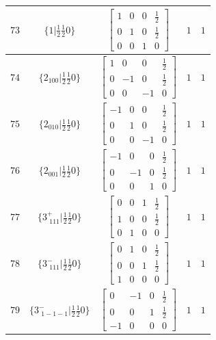 \documentclass[fleqn,8pt]{jsarticle}
\begin{document}
\begin{longtable}{ccccc}
$ 73 $ & $ \{1|\frac{1}{2} \frac{1}{2} 0\} $ & $ \begin{bmatrix} 1 & 0 & 0 & \frac{1}{2} \\ 0 & 1 & 0 & \frac{1}{2} \\ 0 & 0 & 1 & 0 \end{bmatrix} $ & $ 1 $ & $ 1 $ \\ \hline
$ 74 $ & $ \{2{}_{100}|\frac{1}{2} \frac{1}{2} 0\} $ & $ \begin{bmatrix} 1 & 0 & 0 & \frac{1}{2} \\ 0 & -1 & 0 & \frac{1}{2} \\ 0 & 0 & -1 & 0 \end{bmatrix} $ & $ 1 $ & $ 1 $ \\ \hline
$ 75 $ & $ \{2{}_{010}|\frac{1}{2} \frac{1}{2} 0\} $ & $ \begin{bmatrix} -1 & 0 & 0 & \frac{1}{2} \\ 0 & 1 & 0 & \frac{1}{2} \\ 0 & 0 & -1 & 0 \end{bmatrix} $ & $ 1 $ & $ 1 $ \\ \hline
$ 76 $ & $ \{2{}_{001}|\frac{1}{2} \frac{1}{2} 0\} $ & $ \begin{bmatrix} -1 & 0 & 0 & \frac{1}{2} \\ 0 & -1 & 0 & \frac{1}{2} \\ 0 & 0 & 1 & 0 \end{bmatrix} $ & $ 1 $ & $ 1 $ \\ \hline
$ 77 $ & $ \{3^{+}_{\,\,111}|\frac{1}{2} \frac{1}{2} 0\} $ & $ \begin{bmatrix} 0 & 0 & 1 & \frac{1}{2} \\ 1 & 0 & 0 & \frac{1}{2} \\ 0 & 1 & 0 & 0 \end{bmatrix} $ & $ 1 $ & $ 1 $ \\ \hline
$ 78 $ & $ \{3^{-}_{\,\,111}|\frac{1}{2} \frac{1}{2} 0\} $ & $ \begin{bmatrix} 0 & 1 & 0 & \frac{1}{2} \\ 0 & 0 & 1 & \frac{1}{2} \\ 1 & 0 & 0 & 0 \end{bmatrix} $ & $ 1 $ & $ 1 $ \\ \hline
$ 79 $ & $ \{3^{-}_{\,\,1-1-1}|\frac{1}{2} \frac{1}{2} 0\} $ & $ \begin{bmatrix} 0 & -1 & 0 & \frac{1}{2} \\ 0 & 0 & 1 & \frac{1}{2} \\ -1 & 0 & 0 & 0 \end{bmatrix} $ & $ 1 $ & $ 1 $ \\ \hline

\end{longtable}
\end{document}
